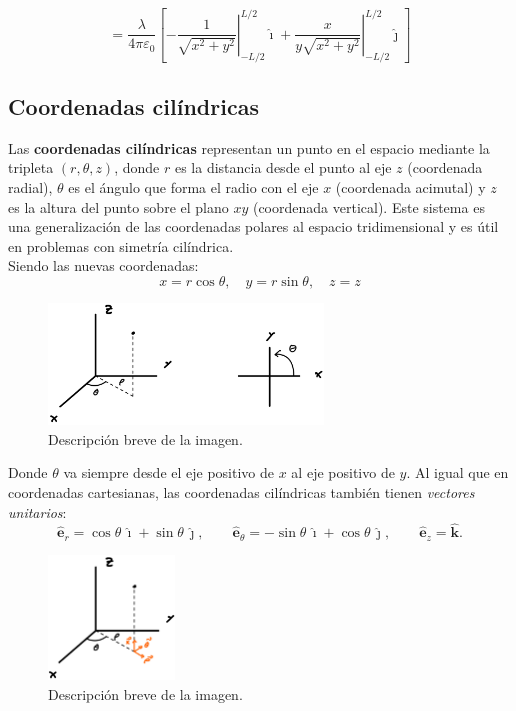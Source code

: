 \documentclass[a4paper,12pt]{article}
\begin{document}
\[
= \frac{\lambda}{4\pi\varepsilon_0} \left[
\left. -\frac{1}{\sqrt{x^2+y^2}} \right|_{-L/2}^{L/2} \hat{\imath}
+ \left. \frac{x}{y\sqrt{x^2+y^2}} \right|_{-L/2}^{L/2} \hat{\jmath}
\right]
\]


\newpage
\subsection{Coordenadas cilíndricas}

\noindent Las \textbf{coordenadas cilíndricas} representan un punto en el espacio mediante la tripleta
 $(r,\theta,z)$, donde $r$ es la distancia desde el punto al eje $z$ (coordenada radial),
  $\theta$ es el ángulo que forma el radio con el eje $x$ (coordenada acimutal) y $z$ es la
   altura del punto sobre el plano $xy$ (coordenada vertical). Este sistema es una generalización
    de las coordenadas polares al espacio tridimensional y es útil en problemas con simetría cilíndrica.\\

\noindent Siendo las nuevas coordenadas:
\[
x = r\cos\theta, \quad y = r\sin\theta, \quad z = z
\]
\vspace{-2.0em}
\begin{figure}[h]
  \centering
  \includegraphics[width=0.65\textwidth]{imagen_5.jpeg}
  \caption{Descripción breve de la imagen.}
  \label{fig:imagen5}
\end{figure}

Donde $\theta$ va siempre desde el eje positivo de $x$ al eje positivo de $y$.
Al igual que en coordenadas cartesianas, las coordenadas cilíndricas también tienen \textit{vectores unitarios}:
\[
\hat{\mathbf e}_r = \cos\theta\,\hat{\imath} + \sin\theta\,\hat{\jmath},\qquad
\hat{\mathbf e}_\theta = -\sin\theta\,\hat{\imath} + \cos\theta\,\hat{\jmath},\qquad
\hat{\mathbf e}_z = \hat{\mathbf k}.
\]
\vspace{-2.0em}
\begin{figure}[h]
  \centering
  \includegraphics[width=0.3\textwidth]{imagen_6.jpeg}
  \caption{Descripción breve de la imagen.}
  \label{fig:imagen6}
\end{figure}
\newpage
\end{document}
